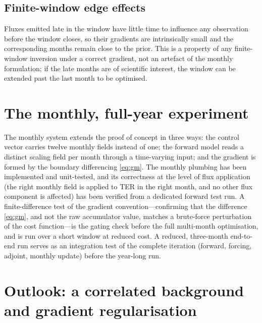 \documentclass[12pt]{article}
\begin{document}
\subsection{Finite-window edge effects}

Fluxes emitted late in the window have little time to influence any observation
before the window closes, so their gradients are intrinsically small and the
corresponding months remain close to the prior. This is a property of any
finite-window inversion under a correct gradient, not an artefact of the monthly
formulation; if the late months are of scientific interest, the window can be
extended past the last month to be optimised.

\section{The monthly, full-year experiment}

The monthly system extends the proof of concept in three ways: the control
vector carries twelve monthly fields instead of one; the forward model reads a
distinct scaling field per month through a time-varying input; and the gradient
is formed by the boundary differencing \eqref{eq:gm}. The monthly plumbing has
been implemented and unit-tested, and its correctness at the level of flux
application (the right monthly field is applied to TER in the right month, and no
other flux component is affected) has been verified from a dedicated forward
test run. A finite-difference test of the gradient convention---confirming that
the difference \eqref{eq:gm}, and not the raw accumulator value, matches a
brute-force perturbation of the cost function---is the gating check before the
full multi-month optimisation, and is run over a short window at reduced cost. A
reduced, three-month end-to-end run serves as an integration test of the complete
iteration (forward, forcing, adjoint, monthly update) before the year-long run.

\section{Outlook: a correlated background and gradient regularisation}
\label{sec:outlook}
\end{document}
